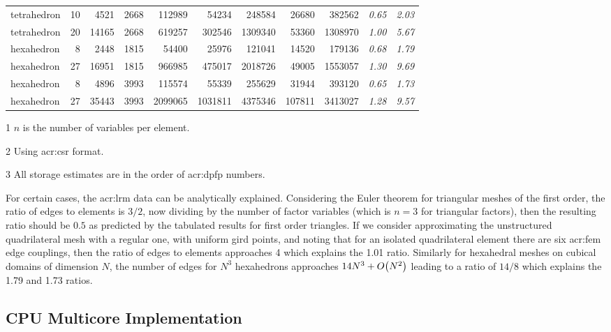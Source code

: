 {\begin{table}
\begin{threeparttable}[t]
\begin{tabular}{lrrrrrrrr>{\itshape}r>{\itshape}r}
			tetrahedron   & 10 & 4521  & 2668 & 112989  & 54234   & 248584  & 26680  & 382562  & 0.65 & 2.03 \tabularnewline
			tetrahedron   & 20 & 14165 & 2668 & 619257  & 302546  & 1309340 & 53360  & 1308970 & 1.00 & 5.67 \tabularnewline
			hexahedron    & 8  & 2448  & 1815 & 54400   & 25976   & 121041  & 14520  & 179136  & 0.68 & 1.79 \tabularnewline
			hexahedron    & 27 & 16951 & 1815 & 966985  & 475017  & 2018726 & 49005  & 1553057 & 1.30 & 9.69 \tabularnewline
			hexahedron    & 8  & 4896  & 3993 & 115574  & 55339   & 255629  & 31944  & 393120  & 0.65 & 1.73 \tabularnewline
			hexahedron    & 27 & 35443 & 3993 & 2099065 & 1031811 & 4375346 & 107811 & 3413027 & 1.28 & 9.57 \tabularnewline
			\bottomrule
		\end{tabular}
		\begin{tablenotes}
			\begin{footnotesize}
			\item[1] {$n$ is the number of variables per element.}
			\item[2] {Using \gls{acr:csr} format.}
			\item[3] {All storage estimates are in the order of \gls{acr:dpfp} numbers.}
			\end{footnotesize}
		\end{tablenotes}
	\end{threeparttable}
\end{table}
\clearpage%
}

For certain cases, the \gls{acr:lrm} data can be analytically explained.
Considering the Euler theorem \cite[p.~28]{bib:Berg2008CGA} for triangular meshes of the first order, the ratio of edges to elements is $3/2$, now dividing by the number of factor variables (which is $n=3$ for triangular factors), then the resulting ratio should be $0.5$ as predicted by the tabulated results for first order triangles.
If we consider approximating the unstructured quadrilateral mesh with a regular one, with uniform gird points, and noting that for an isolated quadrilateral element there are six \gls{acr:fem} edge couplings, then the ratio of edges to elements approaches 4 which explains the 1.01 ratio.
Similarly for hexahedral meshes on cubical domains of dimension $N$, the number of edges for $N^3$ hexahedrons approaches $14N^3 +  O\bigl(N^2\bigr)$ leading to a ratio of $14/8$ which explains the 1.79 and 1.73 ratios.


\subsection{CPU Multicore Implementation}

